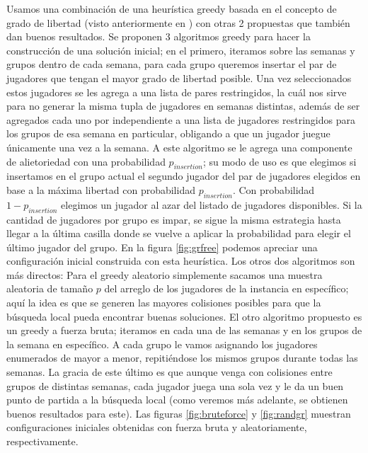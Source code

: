 \documentclass[letter, 10pt]{article}
\begin{document}
Usamos una combinación de una heurística greedy basada en el concepto de grado de libertad (visto anteriormente en \cite{triska2012effective}) con otras 2 propuestas que también dan buenos resultados. Se proponen 3 algoritmos greedy para hacer la construcción de una solución inicial; en el primero, iteramos sobre las semanas y grupos dentro de cada semana, para cada grupo queremos insertar el par de jugadores que tengan el mayor grado de libertad posible. Una vez seleccionados estos jugadores se les agrega a una lista de pares restringidos, la cuál nos sirve para no generar la misma tupla de jugadores en semanas distintas, además de ser agregados cada uno por independiente a una lista de jugadores restringidos para los grupos de esa semana en particular, obligando a que un jugador juegue únicamente una vez a la semana. A este algoritmo se le agrega una componente de alietoriedad con una probabilidad $p_{insertion}$; su modo de uso es que elegimos si insertamos en el grupo actual el segundo jugador del par de jugadores elegidos en base a la máxima libertad con probabilidad $p_{insertion}$. Con probabilidad $1-p_{insertion}$ elegimos un jugador al azar del listado de jugadores disponibles. Si la cantidad de jugadores por grupo es impar, se sigue la misma estrategia hasta llegar a la última casilla donde se vuelve a aplicar la probabilidad para elegir el último jugador del grupo. En la figura \ref{fig:grfree} podemos apreciar una configuración inicial construida con esta heurística. Los otros dos algoritmos son más directos: Para el greedy aleatorio simplemente sacamos una muestra aleatoria de tamaño $p$ del arreglo de los jugadores de la instancia en específico; aquí la idea es que se generen las mayores colisiones posibles para que la búsqueda local pueda encontrar buenas soluciones. El otro algoritmo propuesto es un greedy a fuerza bruta; iteramos en cada una de las semanas y en los grupos de la semana en específico. A cada grupo le vamos asignando los jugadores enumerados de mayor a menor, repitiéndose los mismos grupos durante todas las semanas. La gracia de este último es que aunque venga con colisiones entre grupos de distintas semanas, cada jugador juega una sola vez y le da un buen punto de partida a la búsqueda local (como veremos más adelante, se obtienen buenos resultados para este). Las figuras \ref{fig:bruteforce} y \ref{fig:randgr} muestran configuraciones iniciales obtenidas con fuerza bruta y aleatoriamente, respectivamente.  
\end{document}
